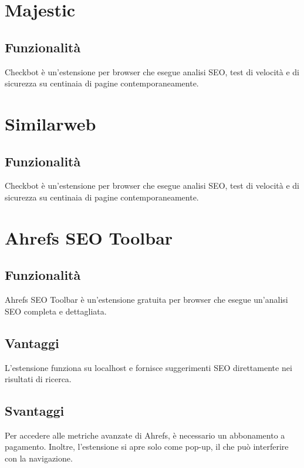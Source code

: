 \section{Majestic}

\subsection{Funzionalità}
\par Checkbot è un'estensione per browser che esegue analisi SEO, test di velocità e di sicurezza su centinaia di pagine contemporaneamente.

\section{Similarweb}

\subsection{Funzionalità}
\par Checkbot è un'estensione per browser che esegue analisi SEO, test di velocità e di sicurezza su centinaia di pagine contemporaneamente.

\section{Ahrefs SEO Toolbar}

\subsection{Funzionalità}
\par Ahrefs SEO Toolbar è un'estensione gratuita per browser che esegue un'analisi SEO completa e dettagliata.

\subsection{Vantaggi}
\par L'estensione funziona su localhost e fornisce suggerimenti SEO direttamente nei risultati di ricerca.

\subsection{Svantaggi}
\par Per accedere alle metriche avanzate di Ahrefs, è necessario un abbonamento a pagamento. Inoltre, l'estensione si apre solo come pop-up, il che può interferire con la navigazione.

